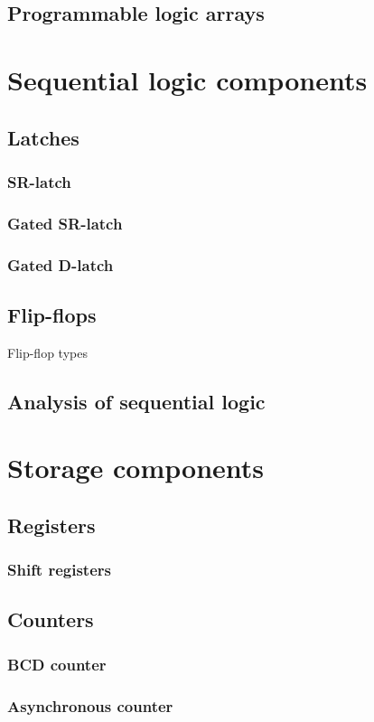 \documentclass{report}
\begin{document}
\subsection{Programmable logic arrays}
\section{Sequential logic components}
\subsection{Latches}
\subsubsection{SR-latch}
\subsubsection{Gated SR-latch}
\subsubsection{Gated D-latch}
\subsection{Flip-flops}
Flip-flop types
\subsection{Analysis of sequential logic}
\section{Storage components}
\subsection{Registers}
\subsubsection{Shift registers}
\subsection{Counters}
\subsubsection{BCD counter}
\subsubsection{Asynchronous counter}
\end{document}
